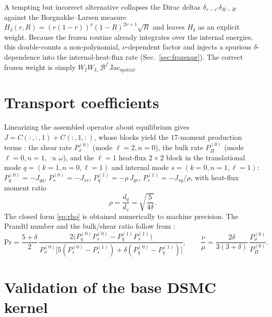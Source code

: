 \documentclass[11pt]{article}
\renewcommand{\Pr}{\mathrm{Pr}}
\begin{document}
A tempting but incorrect alternative collapses the Dirac deltas
$\delta_{r-r'}\delta_{R-R'}$ against the Borgnakke--Larsen measure
$H_\delta(r,R)=(r(1-r))^\nu(1-R)^{2\nu+1}\sqrt R$ and leaves $H_\delta$ as an explicit weight.
Because the frozen routine already integrates over the internal energies, this double-counts a
non-polynomial, $\nu$-dependent factor and injects a spurious $\delta$-dependence into the
internal-heat-flux rate (Sec.~\ref{sec:frozenpr}). The correct frozen weight is simply
$W_I W_{I_*}\,\mathcal{B}^{f}\,\mathrm{Jac}_{\mathrm{spatial}}$.

\section{Transport coefficients}
\label{sec:transport}

Linearizing the assembled operator about equilibrium gives
$J=C(:,:,1)+C(:,1,:)$, whose blocks yield the $17$-moment production terms
\cite[eqs.~(35)--(39)]{Djordjic2023}:
the shear rate $P_\sigma^{(0)}$ (mode $\ell=2,n=0$), the bulk rate $P_\Pi^{(0)}$
(mode $\ell=0,n=1$, $\propto\omega$), and the $\ell=1$ heat-flux $2\times2$ block in the
translational mode $q=(k{=}1,n{=}0,\ell{=}1)$ and internal mode $s=(k{=}0,n{=}1,\ell{=}1)$:
$P_q^{(0)}=-J_{qq}$, $P_s^{(0)}=-J_{ss}$, $P_q^{(1)}=-\rho\,J_{qs}$, $P_s^{(1)}=-J_{sq}/\rho$,
with heat-flux moment ratio
\begin{equation}
\rho=\frac{d_q}{d_s}=\sqrt{\frac{5}{4\delta}} .
\label{eq:rho}
\end{equation}
The closed form \eqref{eq:rho} is obtained numerically to machine precision. The Prandtl number
and the bulk/shear ratio follow from \cite[eqs.~(39),(58)]{Djordjic2023}:
\begin{equation}
\Pr=\frac{5+\delta}{2}\,
\frac{2\big(P_q^{(0)}P_s^{(0)}-P_q^{(1)}P_s^{(1)}\big)}
{P_\sigma^{(0)}\big[5(P_s^{(0)}-P_s^{(1)})+\delta(P_q^{(0)}-P_q^{(1)})\big]},
\qquad
\frac{\nu}{\mu}=\frac{2\delta}{3(3+\delta)}\,\frac{P_\sigma^{(0)}}{P_\Pi^{(0)}}.
\label{eq:Pr}
\end{equation}

\section{Validation of the base DSMC kernel}
\label{sec:validation}
\end{document}

